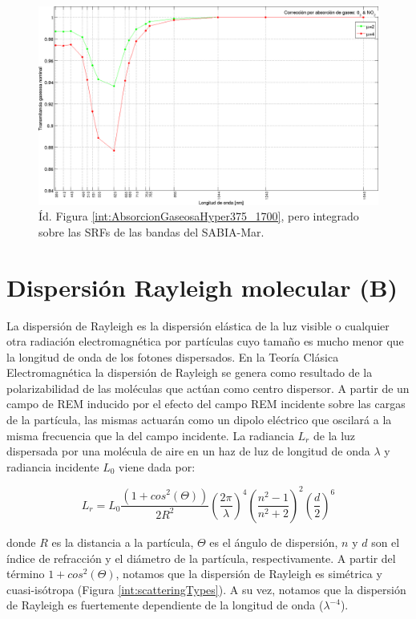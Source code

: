     \begin{figure}
    \centering
    \includegraphics[width=\textwidth]{int/figures/AbsorcionGaseosaSabiaMar.png}
    \caption{Íd. Figura \ref{int:AbsorcionGaseosaHyper375_1700}, pero integrado sobre las SRFs de las bandas del SABIA-Mar.}
    \label{int:AbsorcionGaseosaSabiaMar}
    \end{figure}
    
\section{Dispersión Rayleigh molecular (B)}
\label{int:s:rayleigh}

    La dispersión de Rayleigh es la dispersión elástica de la luz visible o cualquier otra radiación electromagnética por partículas cuyo tamaño es mucho menor que la longitud de onda de los fotones dispersados. En la Teoría Clásica Electromagnética la dispersión de Rayleigh se genera como resultado de la polarizabilidad de las moléculas que actúan como centro dispersor. A partir de un campo de REM inducido por el efecto del campo REM incidente sobre las cargas de la partícula, las mismas actuarán como un dipolo eléctrico que oscilará a la misma frecuencia que la del campo incidente. La radiancia $L_{r} $ de la luz dispersada por una molécula de aire en un haz de luz de longitud de onda $\lambda$ y radiancia incidente $L_{0}$ viene dada por:

    \begin{equation}
        L_{r} = L_{0}{\frac {(1+cos^{2}(\Theta))}{2R^{2}}}\left({\frac{2\pi}{\lambda}}\right)^{4}\left({\frac{n^{2}-1}{n^{2}+2}}\right)^{2}\left({\frac{d}{2}}\right)^{6}
        \label{int:eq:Lray}
    \end{equation}

    \noindent donde $R$ es la distancia a la partícula, $\Theta$ es el ángulo de dispersión, $n$ y $d$ son el índice de refracción y el diámetro de la partícula, respectivamente. A partir del término $1+cos^{2}(\Theta)$, notamos que la dispersión de Rayleigh es simétrica y cuasi-isótropa (Figura \ref{int:scatteringTypes}). A su vez, notamos que la dispersión de Rayleigh es fuertemente dependiente de la longitud de onda ($\lambda^{-4}$).
    

